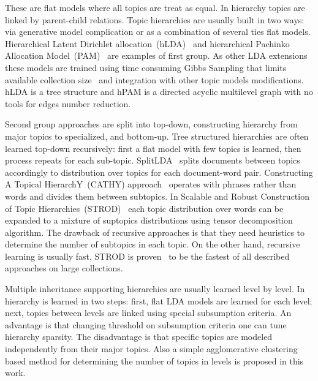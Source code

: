 \documentclass[12pt, twoside]{article}
\begin{document}
These are flat models where all topics are treat as equal. In hierarchy topics are linked by parent-child relations.
Topic hierarchies are usually built in two ways: via generative model complication or as a combination of several ties flat models. Hierarchical Latent Dirichlet allocation~(hLDA)~\cite{hLDA} and hierarchical Pachinko Allocation Model~(PAM)~\cite{hPAM} are examples of first group. As other LDA extensions these models are trained using time consuming Gibbs Sampling that limits available collection size~\cite{STROD} and integration with other topic models modifications. hLDA is a tree structure and hPAM is a directed acyclic multilevel graph with no tools for edges number reduction.

Second group approaches are split into top-down, constructing hierarchy from major topics to specialized, and bottom-up. Tree structured hierarchies are often learned top-down recursively: first a flat model with few topics is learned, then process repeats for each sub-topic. SplitLDA~\cite{splitLDA} splits documents between topics accordingly to distribution over topics for each document-word pair. Constructing A Topical
HierarchY~(CATHY) approach~\cite{CATHY} operates with phrases rather than words and divides them between subtopics. In Scalable and Robust Construction of Topic Hierarchies~(STROD)~\cite{STROD} each topic distribution over words can be expanded to a mixture of suptopics distributions using tensor decomposition algorithm. The drawback of recursive approaches is that they need heuristics to determine the number of subtopics in each topic. On the other hand, recursive learning is usually fast, STROD is proven~\cite{STROD} to be the fastest of all described approaches on large collections.

Multiple inheritance supporting hierarchies are usually learned level by level. In~\cite{Srivastava} hierarchy is learned in two steps: first, flat LDA models are learned for each level; next, topics between levels are linked using special subsumption criteria. An advantage is that changing threshold on subsumption criteria one can tune hierarchy sparsity. The disadvantage is that specific topics are modeled independently from their major topics. Also a simple agglomerative clustering based method for determining the number of topics in levels is proposed in this work. 
\end{document}
